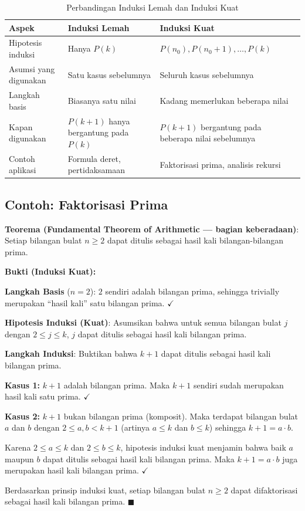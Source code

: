 \begin{table}[H]
\centering
\footnotesize
\renewcommand{\arraystretch}{1.3}
\begin{tabular}{|>{\raggedright\arraybackslash}p{2.8cm}|>{\raggedright\arraybackslash}p{4.2cm}|>{\raggedright\arraybackslash}p{4.2cm}|}
\hline
\textbf{Aspek} & \textbf{Induksi Lemah} & \textbf{Induksi Kuat} \\ \hline
Hipotesis induksi & Hanya $P(k)$ & $P(n_0), P(n_0{+}1), \ldots, P(k)$ \\ \hline
Asumsi yang digunakan & Satu kasus sebelumnya & Seluruh kasus sebelumnya \\ \hline
Langkah basis & Biasanya satu nilai & Kadang memerlukan beberapa nilai \\ \hline
Kapan digunakan & $P(k+1)$ hanya bergantung pada $P(k)$ & $P(k+1)$ bergantung pada beberapa nilai sebelumnya \\ \hline
Contoh aplikasi & Formula deret, pertidaksamaan & Faktorisasi prima, analisis rekursi \\ \hline
\end{tabular}
\caption{Perbandingan Induksi Lemah dan Induksi Kuat}
\end{table}

\subsection{Contoh: Faktorisasi Prima}

\begin{contoh}
\textbf{Teorema (Fundamental Theorem of Arithmetic --- bagian keberadaan)}: Setiap bilangan bulat $n \geq 2$ dapat ditulis sebagai hasil kali bilangan-bilangan prima.

\textbf{Bukti (Induksi Kuat):}

\textbf{Langkah Basis} ($n = 2$):
$2$ sendiri adalah bilangan prima, sehingga trivially merupakan ``hasil kali'' satu bilangan prima. $\checkmark$

\textbf{Hipotesis Induksi (Kuat)}: Asumsikan bahwa untuk semua bilangan bulat $j$ dengan $2 \leq j \leq k$, $j$ dapat ditulis sebagai hasil kali bilangan prima.

\textbf{Langkah Induksi}: Buktikan bahwa $k + 1$ dapat ditulis sebagai hasil kali bilangan prima.

\textbf{Kasus 1:} $k + 1$ adalah bilangan prima. Maka $k+1$ sendiri sudah merupakan hasil kali satu prima. $\checkmark$

\textbf{Kasus 2:} $k + 1$ bukan bilangan prima (komposit). Maka terdapat bilangan bulat $a$ dan $b$ dengan $2 \leq a, b < k + 1$ (artinya $a \leq k$ dan $b \leq k$) sehingga $k + 1 = a \cdot b$.

Karena $2 \leq a \leq k$ dan $2 \leq b \leq k$, hipotesis induksi kuat menjamin bahwa baik $a$ maupun $b$ dapat ditulis sebagai hasil kali bilangan prima. Maka $k + 1 = a \cdot b$ juga merupakan hasil kali bilangan prima. $\checkmark$

Berdasarkan prinsip induksi kuat, setiap bilangan bulat $n \geq 2$ dapat difaktorisasi sebagai hasil kali bilangan prima. $\blacksquare$
\end{contoh}

